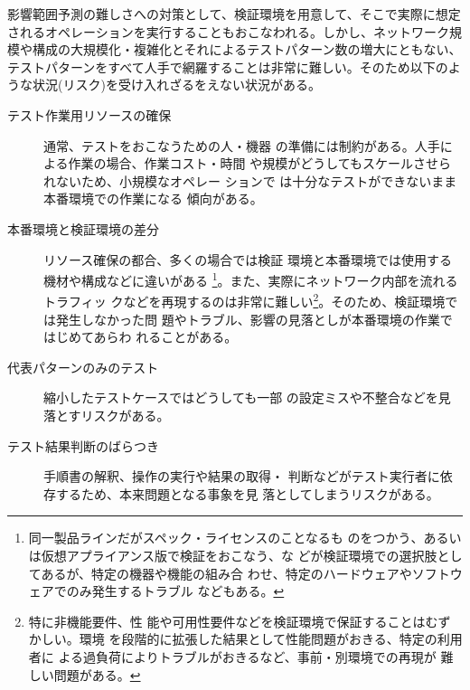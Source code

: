 影響範囲予測の難しさへの対策として、検証環境を用意して、そこで実際に想定
されるオペレーションを実行することもおこなわれる。しかし、ネットワーク規
模や構成の大規模化・複雑化とそれによるテストパターン数の増大にともない、
テストパターンをすべて人手で網羅することは非常に難しい。そのため以下のよ
うな状況(リスク)を受け入れざるをえない状況がある。
\begin{description}
 \item[テスト作業用リソースの確保] 通常、テストをおこなうための人・機器
            の準備には制約がある。人手による作業の場合、作業コスト・時間
            や規模がどうしてもスケールさせられないため、小規模なオペレー
            ションで は十分なテストができないまま本番環境での作業になる
            傾向がある。
 \item[本番環境と検証環境の差分] リソース確保の都合、多くの場合では検証
            環境と本番環境では使用する機材や構成などに違いがある
            \footnote{同一製品ラインだがスペック・ライセンスのことなるも
            のをつかう、あるいは仮想アプライアンス版で検証をおこなう、な
            どが検証環境での選択肢としてあるが、特定の機器や機能の組み合
            わせ、特定のハードウェアやソフトウェアでのみ発生するトラブル
            などもある。}。また、実際にネットワーク内部を流れるトラフィッ
            クなどを再現するのは非常に難しい\footnote{特に非機能要件、性
            能や可用性要件などを検証環境で保証することはむずかしい。環境
            を段階的に拡張した結果として性能問題がおきる、特定の利用者に
            よる過負荷によりトラブルがおきるなど、事前・別環境での再現が
            難しい問題がある。}。そのため、検証環境では発生しなかった問
            題やトラブル、影響の見落としが本番環境の作業ではじめてあらわ
            れることがある。
 \item[代表パターンのみのテスト] 縮小したテストケースではどうしても一部
            の設定ミスや不整合などを見落とすリスクがある。
 \item[テスト結果判断のばらつき] 手順書の解釈、操作の実行や結果の取得・
            判断などがテスト実行者に依存するため、本来問題となる事象を見
            落としてしまうリスクがある。
\end{description}

